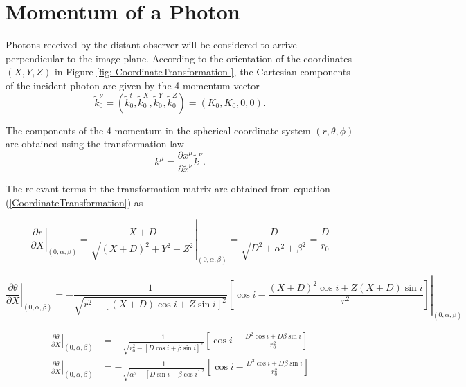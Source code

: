 \section{Momentum of a Photon}

Photons received by the distant observer will be considered to arrive perpendicular to the image plane. According to the orientation of the coordinates $(X,Y,Z)$ in Figure \ref{fig: CoordinateTransformation }, the Cartesian components of the incident photon are given by the 4-momentum vector
\begin{equation}
\tilde{k}^\nu_0 =\left( \tilde{k}^t_0, \tilde{k}^X_0, \tilde{k}^Y_0, \tilde{k}^Z_0 \right) = \left( K_0, K_0, 0, 0 \right).
\end{equation}

The components of the 4-momentum in the spherical coordinate system $(r,\theta,\phi)$ are obtained using the transformation law
\begin{equation}
k^\mu = \frac{\partial x^\mu}{\partial \tilde{x}^\nu} \tilde{k}^\nu.
\end{equation}




The relevant terms in the transformation matrix are obtained from equation (\ref{CoordinateTransformation}) as

\begin{equation}
\left. \frac{\partial r}{\partial X} \right|_{(0,\alpha,\beta)}= \left.\frac{X+D}{\sqrt{(X+D)^2 + Y^2 + Z^2}}\right|_{(0,\alpha,\beta)}
= \frac{D}{\sqrt{D^2 + \alpha^2 + \beta^2}} = \frac{D}{r_0}
\end{equation}

\footnotesize
\begin{equation}
\left. \frac{\partial \theta}{\partial X} \right|_{(0,\alpha,\beta)} = \left.-\frac{1}{\sqrt{r^2-[(X+D)\cos i + Z \sin i]^2}}  \left[ \cos i - \frac{(X+D)^2 \cos i + Z(X+D) \sin i}{r^2}\right]\right|_{(0,\alpha,\beta)} \nonumber
\end{equation}
\normalsize

\begin{align}
\left. \frac{\partial \theta}{\partial X} \right|_{(0,\alpha,\beta)} &= -\frac{1}{\sqrt{r^2_0 -[D\cos i + \beta \sin i]^2}}  \left[ \cos i - \frac{D^2 \cos i + D\beta \sin i}{r^2_0}\right]\\
\left. \frac{\partial \theta}{\partial X} \right|_{(0,\alpha,\beta)} &= -\frac{1}{\sqrt{\alpha^2 +[D\sin i - \beta \cos i]^2}}  \left[ \cos i - \frac{D^2 \cos i + D\beta \sin i}{r^2_0}\right]
\end{align}


